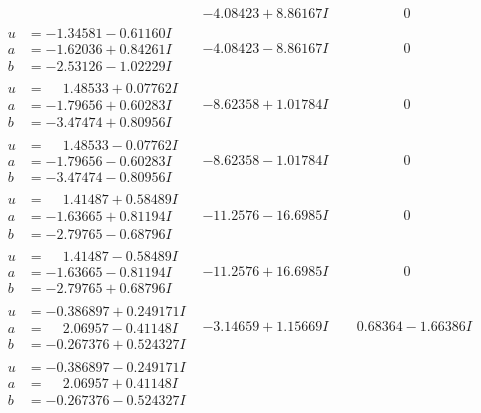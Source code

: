 \documentclass[1p]{elsarticle_modified}
\theoremstyle{definition}
\begin{document}
$$\begin{array}{c|c|c}
 & -4.08423 + 8.86167 I & \phantom{-0.000000 } 0 \\ \hline\begin{aligned}
u &= -1.34581 - 0.61160 I \\
a &= -1.62036 + 0.84261 I \\
b &= -2.53126 - 1.02229 I\end{aligned}
 & -4.08423 - 8.86167 I & \phantom{-0.000000 } 0 \\ \hline\begin{aligned}
u &= \phantom{-}1.48533 + 0.07762 I \\
a &= -1.79656 + 0.60283 I \\
b &= -3.47474 + 0.80956 I\end{aligned}
 & -8.62358 + 1.01784 I & \phantom{-0.000000 } 0 \\ \hline\begin{aligned}
u &= \phantom{-}1.48533 - 0.07762 I \\
a &= -1.79656 - 0.60283 I \\
b &= -3.47474 - 0.80956 I\end{aligned}
 & -8.62358 - 1.01784 I & \phantom{-0.000000 } 0 \\ \hline\begin{aligned}
u &= \phantom{-}1.41487 + 0.58489 I \\
a &= -1.63665 + 0.81194 I \\
b &= -2.79765 - 0.68796 I\end{aligned}
 & -11.2576 - 16.6985 I & \phantom{-0.000000 } 0 \\ \hline\begin{aligned}
u &= \phantom{-}1.41487 - 0.58489 I \\
a &= -1.63665 - 0.81194 I \\
b &= -2.79765 + 0.68796 I\end{aligned}
 & -11.2576 + 16.6985 I & \phantom{-0.000000 } 0 \\ \hline\begin{aligned}
u &= -0.386897 + 0.249171 I \\
a &= \phantom{-}2.06957 - 0.41148 I \\
b &= -0.267376 + 0.524327 I\end{aligned}
 & -3.14659 + 1.15669 I & \phantom{-}0.68364 - 1.66386 I \\ \hline\begin{aligned}
u &= -0.386897 - 0.249171 I \\
a &= \phantom{-}2.06957 + 0.41148 I \\
b &= -0.267376 - 0.524327 I\end{aligned}

\end{array}$$
\end{document}
